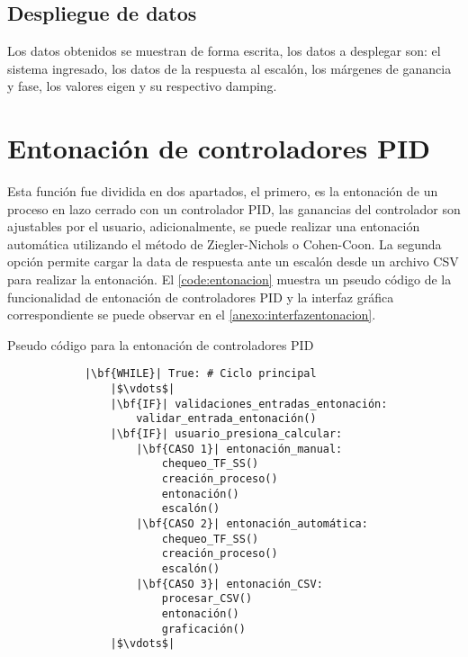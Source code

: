     \subsection{Despliegue de datos}
        
        Los datos obtenidos se muestran de forma escrita, los datos a desplegar son: el sistema ingresado, los datos de la respuesta al escalón, los márgenes de ganancia y fase, los valores eigen y su respectivo damping.

\section{Entonación de controladores PID}

    Esta función fue dividida en dos apartados, el primero, es la entonación de un proceso en lazo cerrado con un controlador PID, las ganancias del controlador son ajustables por el usuario, adicionalmente, se puede realizar una entonación automática utilizando el método de Ziegler-Nichols o Cohen-Coon. La segunda opción permite cargar la data de respuesta ante un escalón desde un archivo CSV para realizar la entonación. El \cref{code:entonacion} muestra un pseudo código de la funcionalidad de entonación de controladores PID y la interfaz gráfica correspondiente se puede observar en el \ref{anexo:interfazentonacion}.    
    
    \begin{longlisting}
        \caption[Pseudo código - Entonación de controladores PID]{Pseudo código para la entonación de controladores PID}
        \label{code:entonacion}				
        \begin{verbatim}
            |\bf{WHILE}| True: # Ciclo principal
                |$\vdots$|
                |\bf{IF}| validaciones_entradas_entonación:
                    validar_entrada_entonación()
                |\bf{IF}| usuario_presiona_calcular:
                    |\bf{CASO 1}| entonación_manual:
                        chequeo_TF_SS()
                        creación_proceso()
                        entonación()
                        escalón()
                    |\bf{CASO 2}| entonación_automática:
                        chequeo_TF_SS()
                        creación_proceso()
                        escalón()
                    |\bf{CASO 3}| entonación_CSV:
                        procesar_CSV()
                        entonación()
                        graficación()
                |$\vdots$|
        \end{verbatim}
    \end{longlisting}

